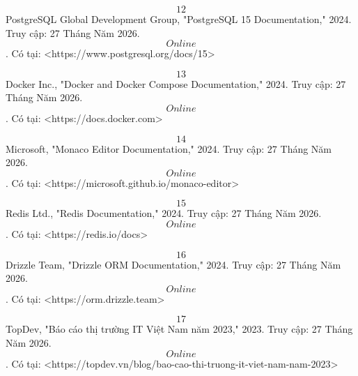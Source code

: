 \documentclass[../main.tex]{subfiles}
\begin{document}
\[12\] PostgreSQL Global Development Group, "PostgreSQL 15 Documentation," 2024. Truy cập: 27 Tháng Năm 2026. \[Online\]. Có tại: <https://www.postgresql.org/docs/15>

\[13\] Docker Inc., "Docker and Docker Compose Documentation," 2024. Truy cập: 27 Tháng Năm 2026. \[Online\]. Có tại: <https://docs.docker.com>

\[14\] Microsoft, "Monaco Editor Documentation," 2024. Truy cập: 27 Tháng Năm 2026. \[Online\]. Có tại: <https://microsoft.github.io/monaco-editor>

\[15\] Redis Ltd., "Redis Documentation," 2024. Truy cập: 27 Tháng Năm 2026. \[Online\]. Có tại: <https://redis.io/docs>

\[16\] Drizzle Team, "Drizzle ORM Documentation," 2024. Truy cập: 27 Tháng Năm 2026. \[Online\]. Có tại: <https://orm.drizzle.team>

\[17\] TopDev, "Báo cáo thị trường IT Việt Nam năm 2023," 2023. Truy cập: 27 Tháng Năm 2026. \[Online\]. Có tại: <https://topdev.vn/blog/bao-cao-thi-truong-it-viet-nam-nam-2023>
\end{document}
